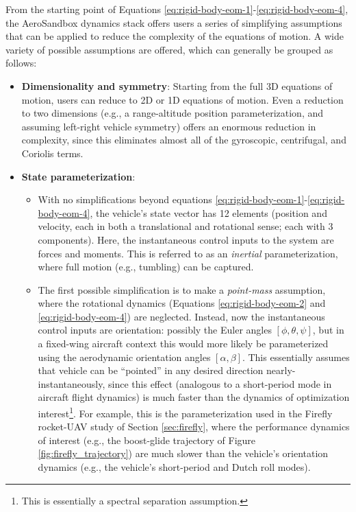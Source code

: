 From the starting point of Equations \ref{eq:rigid-body-eom-1}-\ref{eq:rigid-body-eom-4}, the AeroSandbox dynamics stack offers users a series of simplifying assumptions that can be applied to reduce the complexity of the equations of motion. A wide variety of possible assumptions are offered, which can generally be grouped as follows:
\begin{itemize}
    \item \textbf{Dimensionality and symmetry}: Starting from the full 3D equations of motion, users can reduce to 2D or 1D equations of motion. Even a reduction to two dimensions (e.g., a range-altitude position parameterization, and assuming left-right vehicle symmetry) offers an enormous reduction in complexity, since this eliminates almost all of the gyroscopic, centrifugal, and Coriolis terms.
    \item \textbf{State parameterization}:
    \begin{itemize}
        \item With no simplifications beyond equations \ref{eq:rigid-body-eom-1}-\ref{eq:rigid-body-eom-4}, the vehicle's state vector has 12 elements (position and velocity, each in both a translational and rotational sense; each with 3 components). Here, the instantaneous control inputs to the system are forces and moments. This is referred to as an \emph{inertial} parameterization, where full motion (e.g., tumbling) can be captured.
        \item The first possible simplification is to make a \emph{point-mass} assumption, where the rotational dynamics (Equations \ref{eq:rigid-body-eom-2} and \ref{eq:rigid-body-eom-4}) are neglected. Instead, now the instantaneous control inputs are orientation: possibly the Euler angles $[\phi, \theta, \psi]$, but in a fixed-wing aircraft context this would more likely be parameterized using the aerodynamic orientation angles $[\alpha, \beta]$. This essentially assumes that vehicle can be ``pointed'' in any desired direction nearly-instantaneously, since this effect (analogous to a short-period mode in aircraft flight dynamics) is much faster than the dynamics of optimization interest\footnote{This is essentially a spectral separation assumption.}. For example, this is the parameterization used in the Firefly rocket-UAV study of Section \ref{sec:firefly}, where the performance dynamics of interest (e.g., the boost-glide trajectory of Figure \ref{fig:firefly_trajectory}) are much slower than the vehicle's orientation dynamics (e.g., the vehicle's short-period and Dutch roll modes).

\end{itemize}
\end{itemize}
